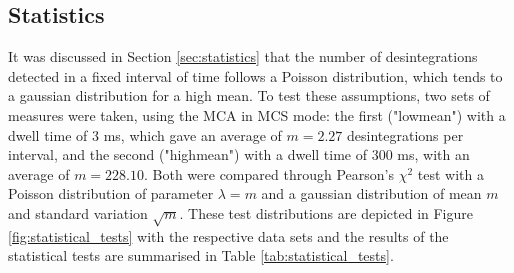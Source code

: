 \subsection{Statistics}
It was discussed in Section \ref{sec:statistics} that the number of desintegrations detected 
in a fixed interval of time follows a Poisson distribution, which tends to 
a gaussian distribution for a high mean.
To test these assumptions, two sets of measures were taken, using the MCA in MCS mode: 
the first ("lowmean") with a dwell time of $3$ ms, which gave an average of $m = 2.27$ desintegrations per interval, 
and the second ("highmean") with a dwell time of $300$ ms, with an average of $m = 228.10$.
Both were compared through Pearson's $\chi^2$ test 
with a Poisson distribution of parameter $\lambda = m$ 
and a gaussian distribution of mean $m$ and standard variation $\sqrt{m}$.
These test distributions are depicted in Figure \ref{fig:statistical_tests} with
the respective data sets
and the results of the statistical tests are summarised in Table \ref{tab:statistical_tests}.
%
